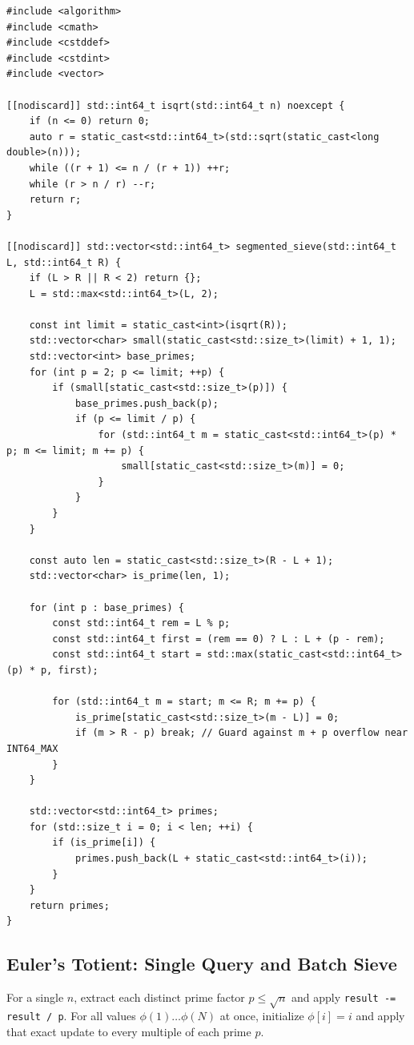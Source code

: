\documentclass[11pt,a4paper]{article}
\theoremstyle{definition}
\begin{document}
\begin{lstlisting}[caption={Segmented Sieve Finding All Primes in Range $L$ to $R$ ($R \le 10^{12}$)}]
#include <algorithm>
#include <cmath>
#include <cstddef>
#include <cstdint>
#include <vector>

[[nodiscard]] std::int64_t isqrt(std::int64_t n) noexcept {
    if (n <= 0) return 0;
    auto r = static_cast<std::int64_t>(std::sqrt(static_cast<long double>(n)));
    while ((r + 1) <= n / (r + 1)) ++r;
    while (r > n / r) --r;
    return r;
}

[[nodiscard]] std::vector<std::int64_t> segmented_sieve(std::int64_t L, std::int64_t R) {
    if (L > R || R < 2) return {};
    L = std::max<std::int64_t>(L, 2);

    const int limit = static_cast<int>(isqrt(R));
    std::vector<char> small(static_cast<std::size_t>(limit) + 1, 1);
    std::vector<int> base_primes;
    for (int p = 2; p <= limit; ++p) {
        if (small[static_cast<std::size_t>(p)]) {
            base_primes.push_back(p);
            if (p <= limit / p) {
                for (std::int64_t m = static_cast<std::int64_t>(p) * p; m <= limit; m += p) {
                    small[static_cast<std::size_t>(m)] = 0;
                }
            }
        }
    }

    const auto len = static_cast<std::size_t>(R - L + 1);
    std::vector<char> is_prime(len, 1);

    for (int p : base_primes) {
        const std::int64_t rem = L % p;
        const std::int64_t first = (rem == 0) ? L : L + (p - rem);
        const std::int64_t start = std::max(static_cast<std::int64_t>(p) * p, first);

        for (std::int64_t m = start; m <= R; m += p) {
            is_prime[static_cast<std::size_t>(m - L)] = 0;
            if (m > R - p) break; // Guard against m + p overflow near INT64_MAX
        }
    }

    std::vector<std::int64_t> primes;
    for (std::size_t i = 0; i < len; ++i) {
        if (is_prime[i]) {
            primes.push_back(L + static_cast<std::int64_t>(i));
        }
    }
    return primes;
}
\end{lstlisting}

\subsection{Euler's Totient: Single Query and Batch Sieve}

For a single $n$, extract each distinct prime factor $p \le \sqrt{n}$ and apply \texttt{result -= result / p}. For all values $\phi(1) \dots \phi(N)$ at once, initialize $\phi[i] = i$ and apply that exact update to every multiple of each prime $p$.
\end{document}
